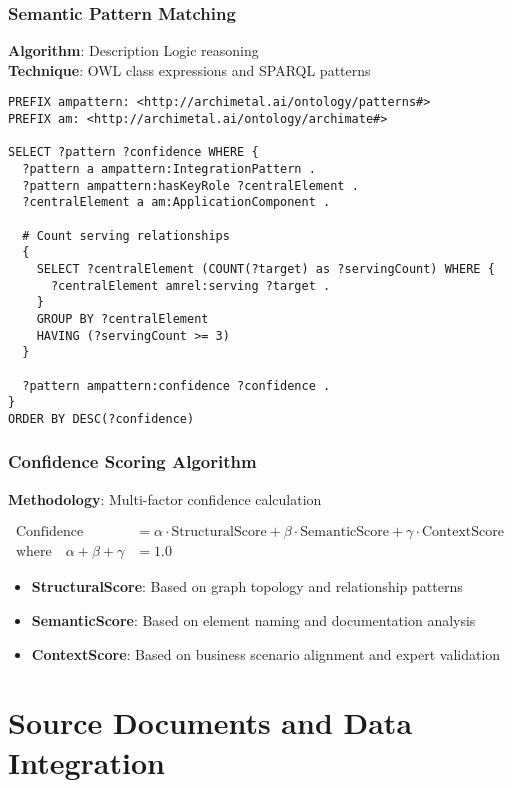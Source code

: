 \documentclass[12pt,a4paper]{article}
\begin{document}
\subsubsection{Semantic Pattern Matching}
\textbf{Algorithm}: Description Logic reasoning\\
\textbf{Technique}: OWL class expressions and SPARQL patterns

\begin{lstlisting}[style=sparql,caption=Pattern Discovery Query]
PREFIX ampattern: <http://archimetal.ai/ontology/patterns#>
PREFIX am: <http://archimetal.ai/ontology/archimate#>

SELECT ?pattern ?confidence WHERE {
  ?pattern a ampattern:IntegrationPattern .
  ?pattern ampattern:hasKeyRole ?centralElement .
  ?centralElement a am:ApplicationComponent .

  # Count serving relationships
  {
    SELECT ?centralElement (COUNT(?target) as ?servingCount) WHERE {
      ?centralElement amrel:serving ?target .
    }
    GROUP BY ?centralElement
    HAVING (?servingCount >= 3)
  }

  ?pattern ampattern:confidence ?confidence .
}
ORDER BY DESC(?confidence)
\end{lstlisting}

\subsubsection{Confidence Scoring Algorithm}
\textbf{Methodology}: Multi-factor confidence calculation

\begin{align}
\text{Confidence} &= \alpha \cdot \text{StructuralScore} + \beta \cdot \text{SemanticScore} + \gamma \cdot \text{ContextScore}\\
\text{where} \quad \alpha + \beta + \gamma &= 1.0
\end{align}

\begin{itemize}
    \item \textbf{StructuralScore}: Based on graph topology and relationship patterns
    \item \textbf{SemanticScore}: Based on element naming and documentation analysis
    \item \textbf{ContextScore}: Based on business scenario alignment and expert validation
\end{itemize}

\section{Source Documents and Data Integration}
\end{document}
